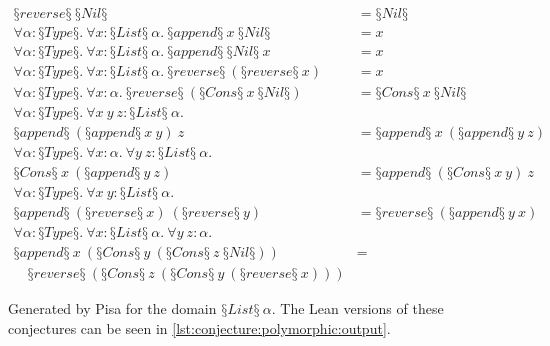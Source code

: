 \vspace{-0.8cm}
\begin{conjectureset}[H]
\begin{align}
§reverse§\ §Nil§ &= §Nil§ \label{fixpoint1}\\
\forall \alpha : §Type§.\ \forall x : §List§\ \alpha.\ §append§\ x\ §Nil§ &= x \label{identityElement1}\\
\forall \alpha : §Type§.\ \forall x : §List§\ \alpha.\ §append§\ §Nil§\ x &= x \label{identityElement2}\\
\forall \alpha : §Type§.\ \forall x : §List§\ \alpha.\ §reverse§\ (§reverse§\ x) &= x \label{reverseinverse}\\
\forall \alpha : §Type§.\ \forall x : \alpha.\ §reverse§\ (§Cons§\ x\ §Nil§) &= §Cons§\ x\ §Nil§ \label{fixpoint2}\\
\forall \alpha : §Type§.\ \forall x\ y\ z : §List§\ \alpha.\ \nonumber\\
  §append§\ (§append§\ x\ y)\ z &= §append§\ x\ (§append§\ y\ z) \label{appendassoc}\\
\forall \alpha : §Type§.\ \forall x : \alpha.\ \forall y\ z : §List§\ \alpha.\ \nonumber\\
  §Cons§\ x\ (§append§\ y\ z) &= §append§\ (§Cons§\ x\ y)\ z\\
\forall \alpha : §Type§.\ \forall x\ y : §List§\ \alpha.\ \nonumber\\
  §append§\ (§reverse§\ x)\ (§reverse§\ y) &= §reverse§\ (§append§\ y\ x)\\
\forall \alpha : §Type§.\ \forall x : §List§\ \alpha.\ \forall y\ z : \alpha.\ \nonumber\\
  §append§\ x\ (§Cons§\ y\ (§Cons§\ z\ §Nil§)) &= \nonumber \\
  \quad §reverse§\ (§Cons§\ z\ (§Cons§\ y\ (§reverse§\ x)))
\end{align}
\vspace{-0.9cm}
\caption[Generated by Pisa for the domain $§List§\ \alpha$.]{
  Generated by Pisa for the domain $§List§\ \alpha$.
  The Lean versions of these conjectures can be seen in \cref{lst:conjecture:polymorphic:output}.
}\label{eqs:list}
\end{conjectureset}

